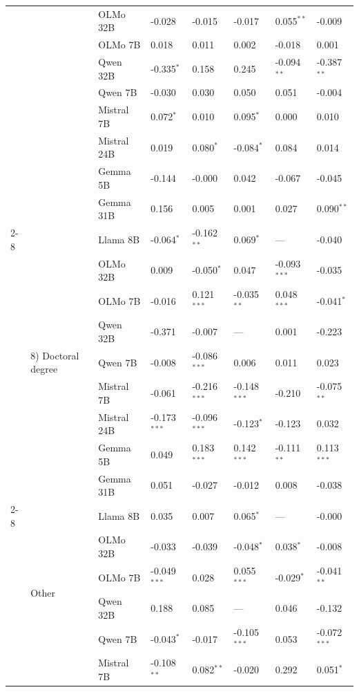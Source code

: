 \begin{longtable}[t]{llllllll}
 &  & OLMo 32B & -0.028 & -0.015 & -0.017 & 0.055$^{**}$ & -0.009 \\
 &  & OLMo 7B & 0.018 & 0.011 & 0.002 & -0.018 & 0.001 \\
 &  & Qwen 32B & -0.335$^{*}$ & 0.158 & 0.245 & -0.094$^{**}$ & -0.387$^{**}$ \\
 &  & Qwen 7B & -0.030 & 0.030 & 0.050 & 0.051 & -0.004 \\
 &  & Mistral 7B & 0.072$^{*}$ & 0.010 & 0.095$^{*}$ & 0.000 & 0.010 \\
 &  & Mistral 24B & 0.019 & 0.080$^{*}$ & -0.084$^{*}$ & 0.084 & 0.014 \\
 &  & Gemma 5B & -0.144 & -0.000 & 0.042 & -0.067 & -0.045 \\
 &  & Gemma 31B & 0.156 & 0.005 & 0.001 & 0.027 & 0.090$^{**}$ \\
\cline{2-8}
 & \multirow[t]{9}{*}{8) Doctoral degree} & Llama 8B & -0.064$^{*}$ & -0.162$^{**}$ & 0.069$^{*}$ & --- & -0.040 \\
 &  & OLMo 32B & 0.009 & -0.050$^{*}$ & 0.047 & -0.093$^{***}$ & -0.035 \\
 &  & OLMo 7B & -0.016 & 0.121$^{***}$ & -0.035$^{**}$ & 0.048$^{***}$ & -0.041$^{*}$ \\
 &  & Qwen 32B & -0.371 & -0.007 & --- & 0.001 & -0.223 \\
 &  & Qwen 7B & -0.008 & -0.086$^{***}$ & 0.006 & 0.011 & 0.023 \\
 &  & Mistral 7B & -0.061 & -0.216$^{***}$ & -0.148$^{***}$ & -0.210 & -0.075$^{**}$ \\
 &  & Mistral 24B & -0.173$^{***}$ & -0.096$^{***}$ & -0.123$^{*}$ & -0.123 & 0.032 \\
 &  & Gemma 5B & 0.049 & 0.183$^{***}$ & 0.142$^{***}$ & -0.111$^{**}$ & 0.113$^{***}$ \\
 &  & Gemma 31B & 0.051 & -0.027 & -0.012 & 0.008 & -0.038 \\
\cline{2-8}
 & \multirow[t]{9}{*}{Other} & Llama 8B & 0.035 & 0.007 & 0.065$^{*}$ & --- & -0.000 \\
 &  & OLMo 32B & -0.033 & -0.039 & -0.048$^{*}$ & 0.038$^{*}$ & -0.008 \\
 &  & OLMo 7B & -0.049$^{***}$ & 0.028 & 0.055$^{***}$ & -0.029$^{*}$ & -0.041$^{**}$ \\
 &  & Qwen 32B & 0.188 & 0.085 & --- & 0.046 & -0.132 \\
 &  & Qwen 7B & -0.043$^{*}$ & -0.017 & -0.105$^{***}$ & 0.053 & -0.072$^{***}$ \\
 &  & Mistral 7B & -0.108$^{**}$ & 0.082$^{**}$ & -0.020 & 0.292 & 0.051$^{*}$ \\

\end{longtable}
